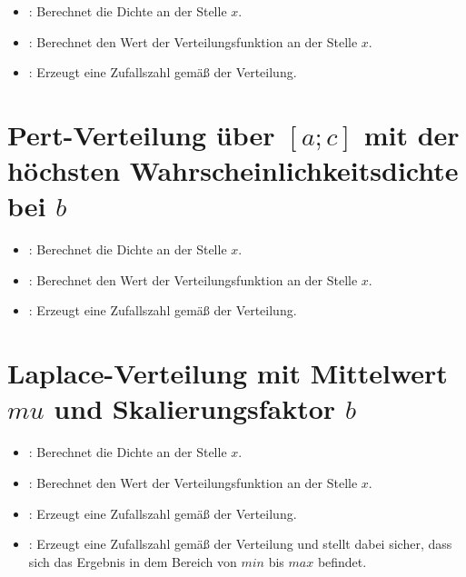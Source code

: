 \begin{itemize}

\item
{}:
Berechnet die Dichte an der Stelle $x$.

\item
{}:
Berechnet den Wert der Verteilungsfunktion an der Stelle $x$.

\item
{}:
Erzeugt eine Zufallszahl gemäß der Verteilung.

\end{itemize}



\section{Pert-Verteilung über \texorpdfstring{$[a;c]$}{[a;c]} mit der höchsten Wahrscheinlichkeitsdichte bei \texorpdfstring{$b$}{b}}

\begin{itemize}

\item
{}:
Berechnet die Dichte an der Stelle $x$.

\item
{}:
Berechnet den Wert der Verteilungsfunktion an der Stelle $x$.

\item
{}:
Erzeugt eine Zufallszahl gemäß der Verteilung.

\end{itemize}



\section{Laplace-Verteilung mit Mittelwert \texorpdfstring{$mu$}{mu} und Skalierungsfaktor \texorpdfstring{$b$}{b}}

\begin{itemize}

\item
{}:
Berechnet die Dichte an der Stelle $x$.

\item
{}:
Berechnet den Wert der Verteilungsfunktion an der Stelle $x$.

\item
{}:
Erzeugt eine Zufallszahl gemäß der Verteilung.

\item
{}:
Erzeugt eine Zufallszahl gemäß der Verteilung und stellt dabei sicher, dass sich das Ergebnis in dem Bereich von $min$ bis $max$ befindet.

\end{itemize}



